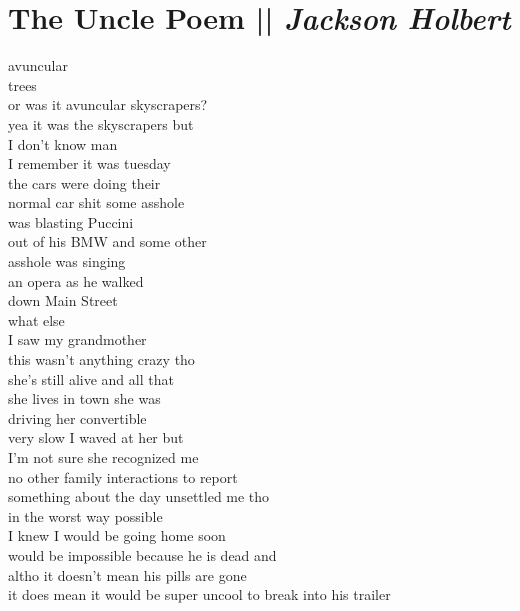 \section[The Uncle Poem]{The Uncle Poem || \emph{Jackson Holbert} \hspace*{\fill}  \thepage}
\label{sec:The_Uncle_Poem}
\vspace*{0.2cm}
\begin{flushleft}
\begin{paracol}{3} %
avuncular\\
trees\\
or was it avuncular skyscrapers?\\
yea it was the skyscrapers but\\
I don’t know man\\
I remember it was tuesday\\
the cars were doing their\\
normal car shit some asshole\\
was blasting Puccini\\
out of his BMW and some other\\
asshole was singing\\
an opera as he walked\\
down Main Street\\
what else\\
I saw my grandmother\\
this wasn’t anything crazy tho\\
she’s still alive and all that\\
she lives in town she was\\
driving her convertible\\
very slow I waved at her but\\
I’m not sure she recognized me\\
no other family interactions to report\\
something about the day unsettled me tho\\
in the worst way possible\\
I knew I would be going home soon \\ %
would be impossible because he is dead and\\
altho it doesn’t mean his pills are gone\\
it does mean it would be super
uncool to break into his trailer\\

\end{paracol}
\end{flushleft}
